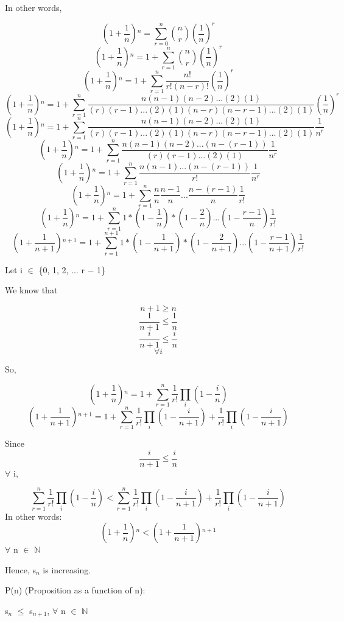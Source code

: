 \documentclass{article}
\newcommand{\mt}[1]{\ensuremath{#1}}
\newcommand{\bn}{\mt{\mathbb{N}} }       %
\newcommand{\fa}{\mt{\forall} }          %
\newcommand{\mem}{\mt{\in} }
\newcommand{\prn}[1]{(#1)}
\newcommand{\bk}[1]{\{#1\}}
\newcommand{\ps}{\mt{+} }
\newcommand{\ms}{\mt{-} }
\newcommand{\ls}{\mt{<} }
\newcommand{\lse}{\mt{\leq} }
\newcommand{\gre}{\mt{\geq} }
\newcommand{\eql}{\mt{=} }
\newcommand{\uw}[2]{#1\mt{_{#2}}}
\newcommand{\uf}[2]{#1\mt{^{#2}}}
\newcommand{\frc}[2]{\mt{\frac{#1}{#2}}}
\newcommand{\nck}[2]{\mt{{#1 \choose #2}}}
\newcommand{\eqn}[1]{\[#1\]}
\begin{document}
{{In other words,

\eqn{\uf{\prn{1 \ps \frc{1}{n}}}{n} \eql \sum_{r = 0}^n \nck{n}{r}(\frac{1}{n})^r}
\eqn{\uf{\prn{1 \ps \frc{1}{n}}}{n} \eql 1 \ps \sum_{r = 1}^n \nck{n}{r}(\frac{1}{n})^r}
\eqn{\uf{\prn{1 \ps \frc{1}{n}}}{n} \eql 1 \ps \sum_{r = 1}^n \frac{n!}{r!(n-r)!} (\frac{1}{n})^r}
\eqn{\uf{\prn{1 \ps \frc{1}{n}}}{n} \eql 1 \ps \sum_{r = 1}^n \frac{n(n - 1)(n - 2)...(2)(1)}{(r)(r - 1)...(2)(1)(n-r)(n-r-1)...(2)(1)} (\frac{1}{n})^r}
\eqn{\uf{\prn{1 \ps \frc{1}{n}}}{n} \eql 1 \ps \sum_{r = 1}^n \frac{n(n - 1)(n - 2)...(2)(1)}{(r)(r - 1)...(2)(1)(n-r)(n-r-1)...(2)(1)} \frac{1}{n^r}}
\eqn{\uf{\prn{1 \ps \frc{1}{n}}}{n} \eql 1 \ps \sum_{r = 1}^n \frac{n(n - 1)(n - 2)...(n - (r - 1))}{(r)(r - 1)...(2)(1)} \frac{1}{n^r}}
\eqn{\uf{\prn{1 \ps \frc{1}{n}}}{n} \eql 1 \ps \sum_{r = 1}^n \frac{n(n - 1)...(n - (r - 1))}{r!} \frac{1}{n^r}}
\eqn{\uf{\prn{1 \ps \frc{1}{n}}}{n} \eql 1 \ps \sum_{r = 1}^n \frac{n}{n}\frac{n - 1}{n}...\frac{n - (r - 1)}{n}\frac{1}{r!}}
\eqn{\uf{\prn{1 \ps \frc{1}{n}}}{n} \eql 1 \ps \sum_{r = 1}^n 1 * ( 1 - \frac{1}{n}) * ( 1 - \frac{2}{n})...(1 - \frac{r - 1}{n})\frac{1}{r!}}
\eqn{\uf{\prn{1 \ps \frc{1}{n + 1}}}{n + 1} \eql 1 \ps \sum_{r = 1}^{n + 1} 1 * ( 1 - \frac{1}{n + 1}) * ( 1 - \frac{2}{n + 1})...(1 - \frac{r - 1}{n + 1})\frac{1}{r!}}

Let i \mem \bk{0, 1, 2, ... r \ms 1}

We know that

\eqn{n + 1 \gre n}
\eqn{\frac{1}{n + 1} \lse \frac{1}{n}}
\eqn{\frac{i}{n + 1} \lse \frac{i}{n}}
\eqn{\fa i}

So,

\eqn{\uf{\prn{1 \ps \frc{1}{n}}}{n} \eql 1 \ps \sum_{r = 1}^n \frac{1}{r!}\prod_i(1 - \frac{i}{n})}
\eqn{\uf{\prn{1 \ps \frc{1}{n + 1}}}{n + 1} \eql 1 \ps \sum_{r = 1}^{n} \frac{1}{r!}\prod_i(1 - \frac{i}{n + 1}) + \frac{1}{r!}\prod_i(1 - \frac{i}{n + 1})}

Since
\eqn{\frac{i}{n + 1} \lse \frac{i}{n}}
\fa i,

\eqn{\sum_{r = 1}^n \frac{1}{r!}\prod_i(1 - \frac{i}{n}) \ls \sum_{r = 1}^{n} \frac{1}{r!}\prod_i(1 - \frac{i}{n + 1}) + \frac{1}{r!}\prod_i(1 - \frac{i}{n + 1})}
In other words:
\eqn{\uf{\prn{1 \ps \frc{1}{n}}}{n} \ls \uf{\prn{1 \ps \frc{1}{n + 1}}}{n + 1}}
\fa n \mem \bn 

Hence, \uw{s}{n} is increasing.



P(n) (Proposition as a function of n):

\uw{s}{n} \lse \uw{s}{n + 1}, \fa n \mem \bn 

}}
\end{document}
